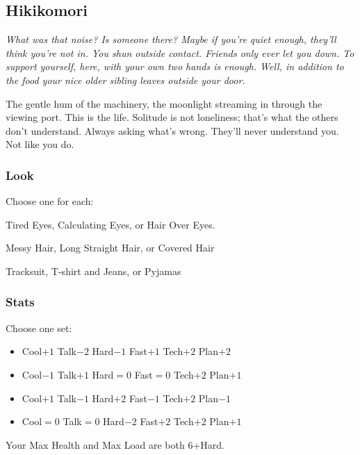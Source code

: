 \subsection{Hikikomori}
{\itshape What was that noise? Is someone there? Maybe if you're quiet
  enough, they'll think you're not in. You shun outside
  contact. Friends only ever let you down. To support yourself, here,
  with your own two hands is enough. Well, in addition to the food
  your nice older sibling leaves outside your door.

The gentle hum of the machinery, the moonlight streaming in through
the viewing port. This is the life. Solitude is not loneliness; that's
what the others don't understand. Always asking what's wrong. They'll
never understand you. Not like you do.}

\subsubsection{Look}
Choose one for each:

Tired Eyes, Calculating Eyes, or Hair Over Eyes.

Messy Hair, Long Straight Hair, or Covered Hair

Tracksuit, T-shirt and Jeans, or Pyjamas

\subsubsection{Stats}
Choose one set:
\begin{itemize}
\setlength\itemsep{0em}
\item Cool$+1$ Talk$-2$ Hard$-1$ Fast$+1$ Tech$+2$ Plan$+2$
\item Cool$-1$ Talk$+1$ Hard${=}0$ Fast${=}0$ Tech$+2$ Plan$+1$
\item Cool$+1$ Talk$-1$ Hard$+2$ Fast$-1$ Tech$+2$ Plan$-1$
\item Cool${=}0$ Talk${=}0$ Hard$-2$ Fast$+2$ Tech$+2$ Plan$+1$
\end{itemize}

Your Max Health and Max Load are both 6+Hard.

